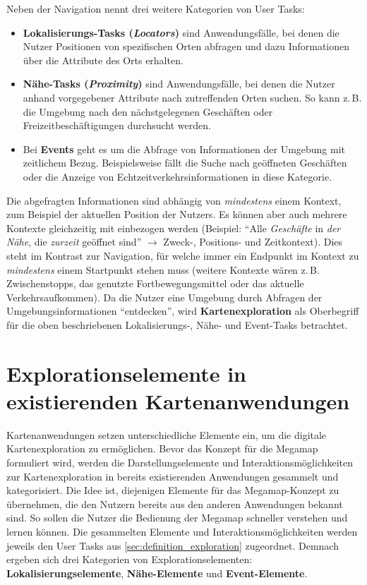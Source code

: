 Neben der Navigation nennt \citeauthor{Reichenbacher2001} drei weitere Kategorien von User Tasks:
\begin{itemize}
    \item \textbf{Lokalisierungs-Tasks (\emph{Locators})} sind Anwendungsfälle, bei denen die Nutzer Positionen von spezifischen Orten abfragen und dazu Informationen über die Attribute des Orts erhalten.
    
    \item \textbf{Nähe-Tasks (\emph{Proximity})} sind Anwendungsfälle, bei denen die Nutzer anhand vorgegebener Attribute nach zutreffenden Orten suchen.
    So kann z.\,B. die Umgebung nach den nächstgelegenen Geschäften oder Freizeitbeschäftigungen durchsucht werden.
    
    \item Bei \textbf{Events} geht es um die Abfrage von Informationen der Umgebung mit zeitlichem Bezug.
    Beispielsweise fällt die Suche nach geöffneten Geschäften oder die Anzeige von Echtzeitverkehrsinformationen in diese Kategorie.
\end{itemize}

Die abgefragten Informationen sind abhängig von \emph{mindestens} einem Kontext, zum Beispiel der aktuellen Position der Nutzers.
Es können aber auch mehrere Kontexte gleichzeitig mit einbezogen werden (Beispiel: \enquote{Alle \emph{Geschäfte} in \emph{der Nähe}, die \emph{zurzeit} geöffnet sind} $\rightarrow$ \mbox{Zweck-}, Positions- und Zeitkontext).
Dies steht im Kontrast zur Navigation, für welche immer ein Endpunkt im Kontext zu \emph{mindestens} einem Startpunkt stehen muss (weitere Kontexte wären z.\,B. Zwischenstopps, das genutzte Fortbewegungsmittel oder das aktuelle Verkehrsaufkommen).
Da die Nutzer eine Umgebung durch Abfragen der Umgebungsinformationen \enquote{entdecken}, wird \textbf{Kartenexploration} als Oberbegriff für die oben beschriebenen Lokalisierungs-, Nähe- und Event-Tasks betrachtet.

\section{Explorationselemente in existierenden Kartenanwendungen}
\label{sec:exploration_elements}
Kartenanwendungen setzen unterschiedliche Elemente ein, um die digitale Kartenexploration zu ermöglichen.
Bevor das Konzept für die Megamap formuliert wird, werden die Darstellungselemente und Interaktionsmöglichkeiten zur Kartenexploration in bereits existierenden Anwendungen gesammelt und kategorisiert.
Die Idee ist, diejenigen Elemente für das Megamap-Konzept zu übernehmen, die den Nutzern bereits aus den anderen Anwendungen bekannt sind.
So sollen die Nutzer die Bedienung der Megamap schneller verstehen und lernen können.
Die gesammelten Elemente und Interaktionsmöglichkeiten werden jeweils den User Tasks aus \autoref{sec:definition_exploration} zugeordnet.
Demnach ergeben sich drei Kategorien von Explorationselementen: \textbf{Lokalisierungselemente}, \textbf{Nähe-Elemente} und \textbf{Event-Elemente}.

